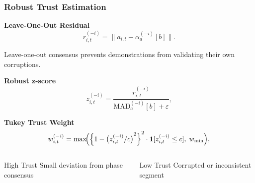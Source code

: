 \documentclass{beamer}
\begin{document}
\begin{frame}
    \frametitle{\textbf{Robust Trust Estimation}}

    \textbf{Leave-One-Out Residual}
    \[
        r_{i,t}^{(-i)} = \|a_{i,t} - \alpha_a^{(-i)}[b]\|.
    \]

    \small
    Leave-one-out consensus prevents demonstrations from validating their own corruptions.

    \vspace{0.75em}

    \textbf{Robust z-score}
    \[
        z_{i,t}^{(-i)} = \frac{r_{i,t}^{(-i)}}{\mathrm{MAD}_a^{(-i)}[b] + \varepsilon},
    \]

    \vspace{0.75em}

    \textbf{Tukey Trust Weight}
    \[
        w_{i,t}^{(-i)} = \max\!\Bigl({\Bigl\{1-{\bigl(z_{i,t}^{(-i)}/c\bigr)}^2\Bigr\}}^2 \cdot \mathbf{1}[z_{i,t}^{(-i)}\leq c],\; w_{\min}\Bigr),
    \]

    \vspace{1em}

    \begin{columns}


        \begin{block}{High Trust}
            Small deviation from phase consensus
        \end{block}


        \begin{alertblock}{Low Trust}
            Corrupted or inconsistent segment
        \end{alertblock}

    \end{columns}

\end{frame}
\end{document}
